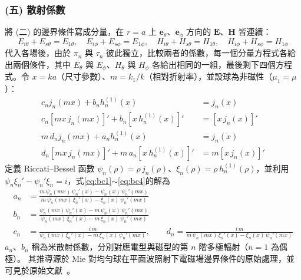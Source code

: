 \subsubsection*{(五) 散射係數}
將 (二) 的邊界條件寫成分量，在 $r = a$ 上 $\mathbf{e}_{\theta}$、$\mathbf{e}_{\phi}$ 方向的 $\mathbf{E}$、$\mathbf{H}$ 皆連續：
\begin{equation}
    E_{i\theta} + E_{s\theta} = E_{1\theta}, \quad E_{i\phi} + E_{s\phi} = E_{1\phi}, \quad H_{i\theta} + H_{s\theta} = H_{1\theta}, \quad H_{i\phi} + H_{s\phi} = H_{1\phi}
\end{equation}
代入各場後，由於 $\pi_n$ 與 $\tau_n$ 彼此獨立，比較兩者的係數，每一個分量方程式各給出兩個條件，其中 $E_{\theta}$ 與 $E_{\phi}$、$H_{\theta}$ 與 $H_{\phi}$ 各給出相同的一組，最後剩下四個方程式。令 $x = ka$（尺寸參數）、$m = k_1/k$（相對折射率），並設球為非磁性（$\mu_1 = \mu$）：
\begin{align}
    c_n j_n(mx) + b_n h_n^{(1)}(x) &= j_n(x) \label{eq:bc1}\\
    c_n \left[ mx\, j_n(mx) \right]' + b_n \left[ x\, h_n^{(1)}(x) \right]' &= \left[ x\, j_n(x) \right]' \\
    m\, d_n j_n(mx) + a_n h_n^{(1)}(x) &= j_n(x) \\
    d_n \left[ mx\, j_n(mx) \right]' + m\, a_n \left[ x\, h_n^{(1)}(x) \right]' &= m \left[ x\, j_n(x) \right]' \label{eq:bc4}
\end{align}
定義 Riccati--Bessel 函數 $\psi_n(\rho) = \rho\, j_n(\rho)$、$\xi_n(\rho) = \rho\, h_n^{(1)}(\rho)$，並利用 $\psi_n \xi_n' - \psi_n' \xi_n = i$，式\eqref{eq:bc1}$\sim$\eqref{eq:bc4}的解為
\begin{align}
    a_n &= \frac{m\, \psi_n(mx)\, \psi_n'(x) - \psi_n(x)\, \psi_n'(mx)}{m\, \psi_n(mx)\, \xi_n'(x) - \xi_n(x)\, \psi_n'(mx)} \\
    b_n &= \frac{\psi_n(mx)\, \psi_n'(x) - m\, \psi_n(x)\, \psi_n'(mx)}{\psi_n(mx)\, \xi_n'(x) - m\, \xi_n(x)\, \psi_n'(mx)} \\
    c_n &= \frac{i\, m}{\psi_n(mx)\, \xi_n'(x) - m\, \xi_n(x)\, \psi_n'(mx)}, \qquad d_n = \frac{i\, m}{m\, \psi_n(mx)\, \xi_n'(x) - \xi_n(x)\, \psi_n'(mx)}
\end{align}
$a_n$、$b_n$ 稱為米散射係數，分別對應電型與磁型的第 $n$ 階多極輻射（$n=1$ 為偶極）。
其推導源於 Mie 對均勻球在平面波照射下電磁場邊界條件的原始處理，並可見於原始文獻~\cite{https://doi.org/10.1002/andp.19083300302}。


